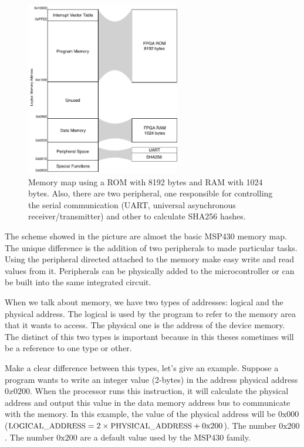 \begin{figure}[h]
	\centering
	\includegraphics[width=0.6\textwidth]{figuras/original_bus}
	\caption{Memory map using a ROM with 8192 bytes and RAM with 1024 bytes. Also, there are two peripheral, one responsible for controlling the serial communication (UART, universal asynchronous receiver/transmitter) and other to calculate SHA256 hashes.}
	\label{fig:original_bus}
\end{figure}

The scheme showed in the picture are almost the basic MSP430 memory map. The unique difference is the addition of two peripherals to made particular tasks. Using the peripheral directed attached to the memory make easy write and read values from it. Peripherals can be physically added to the microcontroller or can be built into the same integrated circuit. 

When we talk about memory, we have two types of addresses: logical and the physical address. The logical is used by the program to refer to the memory area that it wants to access. The physical one is the address of the device memory. The distinct of this two types is important because in this theses sometimes will be a reference to one type or other.

Make a clear difference between this types, let's give an example. Suppose a program wants to write an integer value (2-bytes) in the address physical address $0x0200$. When the processor runs this instruction, it will calculate the physical address and output this value in the data memory address bus to communicate with the memory. In this example, the value of the physical address will be $0\mbox{x}000$ ($\mbox{\small{LOGICAL\_ADDRESS}}= 2 \times \mbox{\small{PHYSICAL\_ADDRESS}} + 0\mbox{x}200$). The number $0\mbox{x}200$. The number $0\mbox{x}200$ are a default value used by the MSP430 family.

